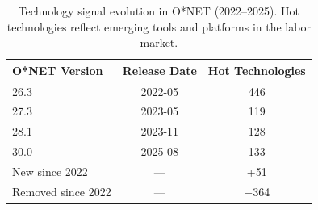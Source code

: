 \begin{table}[t]
\centering
\small
\caption{Technology signal evolution in O*NET (2022--2025). Hot technologies reflect emerging tools and platforms in the labor market.}
\label{tab:tech_evolution}
\begin{tabular}{@{}lcc@{}}
\toprule
{\bf O*NET Version} & {\bf Release Date} & {\bf Hot Technologies} \\
\midrule
26.3 & 2022-05 & 446 \\
27.3 & 2023-05 & 119 \\
28.1 & 2023-11 & 128 \\
30.0 & 2025-08 & 133 \\
\midrule
New since 2022 & --- & +51 \\
Removed since 2022 & --- & $-$364 \\
\bottomrule
\end{tabular}
\end{table}